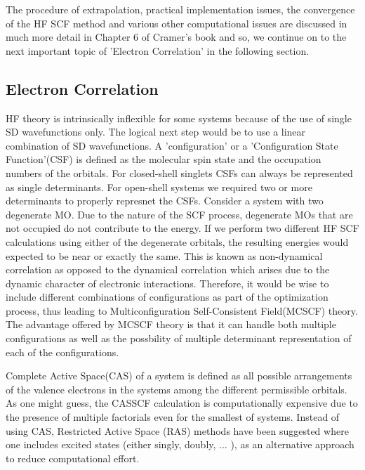             The procedure of extrapolation, practical implementation issues, the convergence of the HF SCF method and various other computational issues are discussed in much more detail in Chapter 6 of Cramer's book \cite{Cramer} and so, we continue on to the next important topic of 'Electron Correlation' in the following section.

        \subsection{Electron Correlation}\label{subsec:electron correlation}
            HF theory is intrinsically inflexible for some systems because of the use of single SD wavefunctions only. The logical next step would be to use a linear combination of SD wavefunctions. A 'configuration' or a 'Configuration State Function'(CSF) is defined as the molecular spin state and the occupation numbers of the orbitals. For closed-shell singlets CSFs can always be represented as single determinants. For open-shell systems we required two or more determinants to properly represnet the CSFs. Consider a system with two degenerate MO. Due to the nature of the SCF process, degenerate MOs that are not occupied do not contribute to the energy. If we perform two different HF SCF calculations using either of the degenerate orbitals, the resulting energies would expected to be near or exactly the same. This is known as non-dynamical correlation as opposed to the dynamical correlation which arises due to the dynamic character of electronic interactions. Therefore, it would be wise to include different combinations of configurations as part of the optimization process, thus leading to Multiconfiguration Self-Consistent Field(MCSCF) theory. The advantage offered by MCSCF theory is that it can handle both multiple configurations as well as the possbility of multiple determinant representation of each of the configurations.

            Complete Active Space(CAS) of a system is defined as all possible arrangements of the valence electrons in the systems among the different permissible orbitals. As one might guess, the CASSCF calculation is computationally expensive due to the presence of multiple factorials even for the smallest of systems. Instead of using CAS, Restricted Active Space (RAS) methods have been suggested where one includes excited states (either singly, doubly, ... ), as an alternative approach to reduce computational effort.

